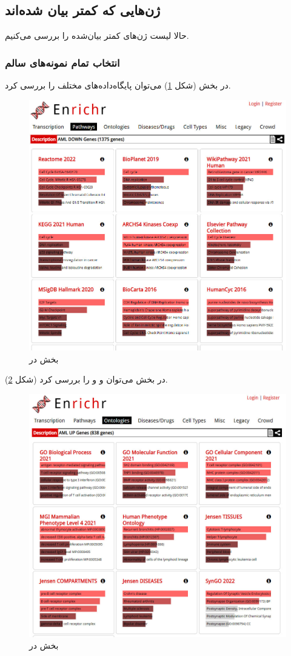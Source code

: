 \documentclass{article}
\begin{document}
\subsection{ژن‌هایی که کمتر بیان شده‌اند}
حالا لیست ژن‌های کمتر بیان‌شده را بررسی می‌کنیم.

\subsubsection{انتخاب تمام نمونه‌های سالم}
در بخش  (شکل \ref{fig:enrichr-pathways-d}) می‌توان پایگاه‌داده‌های  مختلف را بررسی کرد.
\begin{figure}[h!]
	\centering
	\includegraphics[width=0.5\columnwidth]{figs/enrichr-pathways-d.jpg}
	\caption{بخش  در }
	\label{fig:enrichr-pathways-d}
\end{figure}

در بخش  می‌توان  و  و  را بررسی کرد (شکل \ref{fig:enrichr-ontology-d}).
\begin{figure}[h!]
	\centering
	\includegraphics[width=0.5\columnwidth]{figs/enrichr-ontologies-2.jpg}
	\caption{بخش  در }
	\label{fig:enrichr-ontology-d}
\end{figure}
\end{document}
